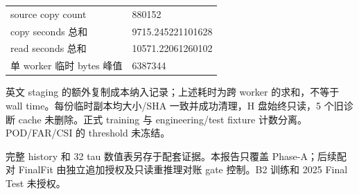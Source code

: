 \documentclass[UTF8,11pt,fontset=windows]{ctexart}
\begin{document}
\begin{tabularx}{\textwidth}{@{}p{41mm}Y@{}}\toprule
source copy count & 880152 \\
copy seconds 总和 & 9715.245221101628 \\
read seconds 总和 & 10571.22061260102 \\
单 worker 临时 bytes 峰值 & 6387344 \\
\bottomrule\end{tabularx}

英文 staging 的额外复制成本纳入记录；上述耗时为跨 worker 的求和，不等于 wall time。每份临时副本均大小/SHA 一致并成功清理，H 盘始终只读，5 个旧诊断 cache 未删除。正式 training 与 engineering/test fixture 计数分离。POD/FAR/CSI 的 threshold 未冻结。

完整 history 和 32 tau 数值表另存于配套证据。本报告只覆盖 Phase-A；后续配对 FinalFit 由独立追加授权及只读重推理对账 gate 控制。B2 训练和 2025 Final Test 未授权。
\end{document}
